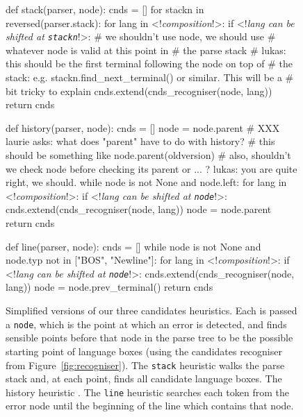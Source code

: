 \documentclass[sigplan,screen]{acmart}\settopmatter{printfolios=true,printccs=false,printacmref=false}
\begin{document}
\begin{figure}[t]
\begin{minipage}[t]{0.55\textwidth}
\begin{lstdefault}[]
def stack(parser, node):
  cnds = []
  for stackn in reversed(parser.stack):
    for lang in <!\textrm{\textit{composition}}!>:
      if <!\textrm{\textit{lang can be shifted at \texttt{stackn}}}!>:
        # we shouldn't use node, we should use
        # whatever node is valid at this point in
        # the parse stack
        # lukas: this should be the first terminal following the node on top of
        # the stack: e.g. stackn.find_next_terminal() or similar. This will be a
        # bit tricky to explain
        cnds.extend(cnds_recogniser(node, lang))
  return cnds

def history(parser, node):
  cnds = []
  node = node.parent # XXX laurie asks: what does "parent" have to do with history?
  # this should be something like node.parent(oldversion)
  # also, shouldn't we check node before checking its parent or ... ? lukas: you are quite right, we should.
  while node is not None and node.left:
    for lang in <!\textrm{\textit{composition}}!>:
      if <!\textrm{\textit{lang can be shifted at \texttt{node}}}!>:
        cnds.extend(cnds_recogniser(node, lang))
    node = node.parent
  return cnds

def line(parser, node):
  cnds = []
  while node is not None and node.typ not in ["BOS", "Newline"]:
    for lang in <!\textrm{\textit{composition}}!>:
      if <!\textrm{\textit{lang can be shifted at \texttt{node}}}!>:
        cnds.extend(cnds_recogniser(node, lang))
    node = node.prev_terminal()
  return cnds
\end{lstdefault}
\end{minipage}
\begin{minipage}[t]{0.44\textwidth}
  \caption{Simplified versions of our three candidates heuristics. Each is
  passed a \texttt{node}, which is the point at which an error is detected, and
finds sensible points before that node in the parse tree to be the possible
starting point of language boxes (using the candidates recogniser from
Figure~\ref{fig:recogniser}). The \texttt{stack} heuristic walks the parse
stack and, at each point, finds all candidate language boxes. The history
heuristic . The \texttt{line} heuristic
searches each token from the error node until the beginning of the line which
contains that node.}
\end{minipage}
\label{lst_find_candidates}
\end{figure}
\end{document}
